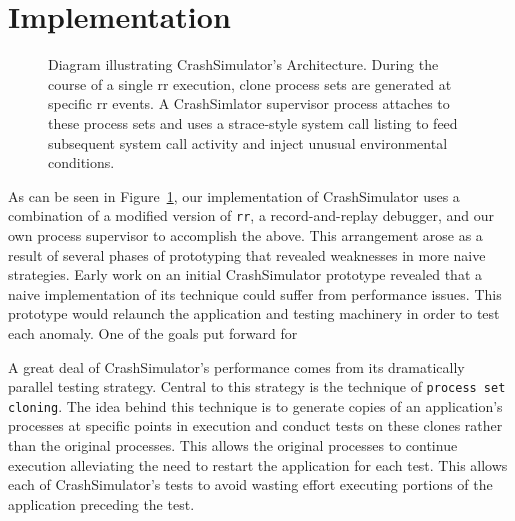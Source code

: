 \section{Implementation}
\label{SEC:Implementation}

\begin{figure}[t]
  \center{}
  \caption{Diagram illustrating CrashSimulator's Architecture.  During the
    course of a single rr execution, clone process sets are generated at
    specific rr events.  A CrashSimlator supervisor process attaches to
    these process sets and uses a strace-style system call listing to feed
    subsequent system call activity and inject unusual environmental
    conditions.}
  \label{figure:architecture}
\end{figure}

As can be seen in Figure~\ref{figure:architecture},
our implementation of CrashSimulator uses a combination of a modified
version of {\tt rr}, a
record-and-replay debugger, and our own process supervisor
to accomplish the above.  This arrangement arose as a result of several
phases of prototyping that revealed weaknesses in more naive strategies.
Early work on an initial CrashSimulator prototype revealed that a naive
implementation of its technique could suffer from performance issues.  This
prototype would relaunch the application and testing machinery in order to
test each anomaly.  One of the goals put forward for

A great deal of CrashSimulator's performance comes from its dramatically
parallel testing strategy.  Central to this strategy is the technique of
{\tt process set cloning}.  The idea behind this technique
is to generate copies
of an application's processes at specific points in execution and conduct
tests on these clones rather than the original processes.  This allows the
original processes to continue execution alleviating the need to restart
the application for each test.  This allows each of CrashSimulator's tests
to avoid wasting effort executing portions of the application preceding
the test.


